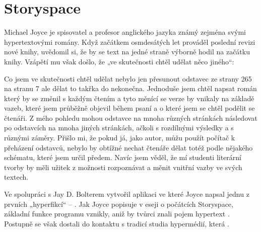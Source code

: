 \section{Storyspace}
\label{sec:storyspace}

Michael Joyce je spisovatel a profesor anglického jazyka známý zejména svými hypertextovými romány. Když začátkem osmdesátých let prováděl poslední revizi nové knihy, uvědomil si, že by se text na jedné straně výborně hodil na začátku knihy. Vzápětí mu však došlo, že „ve skutečnosti chtěl udělat něco jiného“:

\begin{quoted}{\autocite[31]{Joyce:WIR}}
Co jsem ve skutečnosti chtěl udělat nebylo jen přesunout odstavec ze strany 265 na stranu 7 ale dělat to takřka do nekonečna. Jednoduše jsem chtěl napsat román který by se změnil s každým čtením a tyto měnící se verze by vnikaly na základě vazeb, které jsem průběžně objevil během psaní a o které jsem se chtěl podělit se čtenáři.
Z mého pohledu mohou odstavce na mnoha různých stránkách následovat po odstavcích na mnoha jiných stránkách, ačkoli s rozdílnými výsledky a s různými záměry. \textelp{}
Přišlo mi, že pokud já, jako autor, můžu použít počítač k přeházení odstavců, nebylo by obtížné nechat čtenáře dělat totéž podle nějakého schématu, které jsem určil předem. Navíc jsem věděl, že mí studenti literární tvorby by měli užitek z možnosti rozpoznávat a měnit vnitřní vazby ve svých textech.
\end{quoted}

Ve spolupráci s Jay D. Bolterem vytvořil aplikaci  ve které Joyce napsal jednu z prvních „hyperfikcí“ --  \autocite[115--116]{Barnet2014}. Jak Joyce popisuje v eseji  o počátcích Storyspace, základní funkce programu vznikly, aniž by tvůrci znali pojem hypertext \autocite[32]{Joyce:WIR}. Postupně se však dostali do kontaktu s tradicí studia hypermédií, která .

